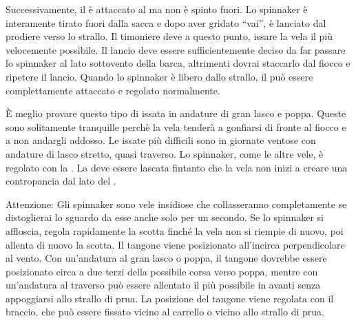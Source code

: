 Successivamente, il \pole è attaccato al \guy ma non è spinto fuori. Lo
spinnaker è interamente tirato fuori dalla sacca e dopo aver gridato ``vai'', è
lanciato dal prodiere verso lo strallo. Il timoniere deve a questo punto, issare
la vela il più velocemente possibile. Il lancio deve essere sufficientemente
deciso da far passare lo spinnaker al lato sottovento della barca, altrimenti
dovrai staccarlo dal fiocco e ripetere il lancio. Quando lo spinnaker è libero
dallo strallo, il \pole può essere complettamente attaccato e regolato
normalmente.

È meglio provare questo tipo di issata in andature di gran lasco e poppa. Queste sono
solitamente tranquille perchè la vela tenderà a gonfiarsi di fronte al fiocco e
a non andargli addosso. Le issate più difficili sono in giornate ventose con
andature di lasco stretto, quasi traverso. Lo spinnaker, come le altre vele, è
regolato con la \sheet. La \sheet deve essere lascata fintanto che la vela non
inizi a creare una contropancia dal lato del \pole.

Attenzione: Gli spinnaker sono vele insidiose che collasseranno completamente se
distoglierai lo sguardo da esse anche solo per un secondo. Se lo spinnaker si
affloscia, regola rapidamente la scotta finché la vela non si riempie di nuovo,
poi allenta di nuovo la scotta. Il tangone viene posizionato all'incirca
perpendicolare al vento. Con un'andatura al gran lasco o poppa, il tangone
dovrebbe essere posizionato circa a due terzi della possibile corsa verso poppa,
mentre con un'andatura al traverso può essere allentato il più possibile in
avanti senza appoggiarsi allo strallo di prua. La posizione del tangone viene
regolata con il braccio, che può essere fissato vicino al carrello o vicino allo
strallo di prua.

